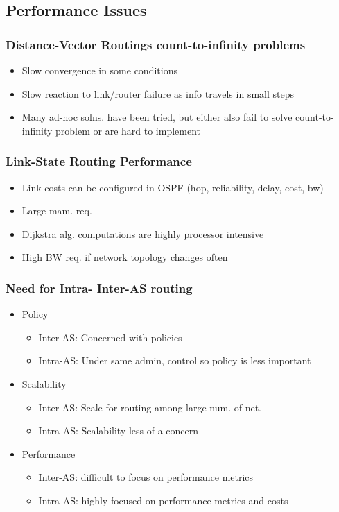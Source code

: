 \documentclass[a4paper]{article}
\begin{document}
\subsection{Performance Issues}
\subsubsection{Distance-Vector Routings count-to-infinity problems}
\begin{itemize}
	\item Slow convergence in some conditions
	\item Slow reaction to link/router failure as info travels in small
		steps
	\item Many ad-hoc solns. have been tried, but either also fail to solve
		count-to-infinity problem or are hard to implement
\end{itemize}
\subsubsection{Link-State Routing Performance}
\begin{itemize}
	\item Link costs can be configured in OSPF (hop, reliability, delay,
		cost, bw)
	\item Large mam. req.
	\item Dijkstra alg. computations are highly processor intensive
	\item High BW req. if network topology changes often
\end{itemize}
\subsubsection{Need for Intra- Inter-AS routing}
\begin{itemize}
	\item Policy
	\begin{itemize}
		\item Inter-AS: Concerned with policies
		\item Intra-AS: Under same admin, control so policy is less
			important
	\end{itemize}
	\item Scalability
		\begin{itemize}
			\item Inter-AS: Scale for routing among large num. of
				net.
			\item Intra-AS: Scalability less of a concern
		\end{itemize}
	\item Performance
	\begin{itemize}
		\item Inter-AS: difficult to focus on performance metrics
		\item Intra-AS: highly focused on performance metrics and costs
	\end{itemize}
\end{itemize}
\end{document}
